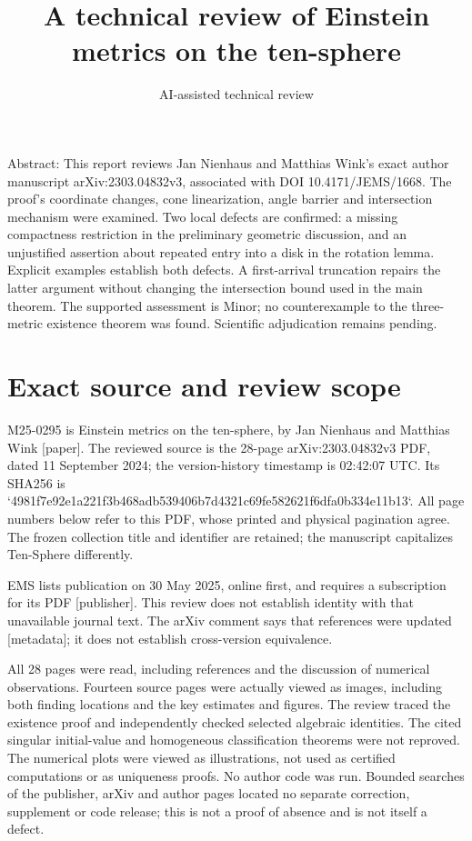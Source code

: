 \documentclass[10pt]{article}
\title{A technical review of
Einstein metrics on the ten-sphere}
\author{AI-assisted technical review}
\date{}
\begin{document}
\maketitle
Abstract: This report reviews Jan Nienhaus and Matthias Wink’s exact author manuscript arXiv:2303.04832v3, associated with DOI 10.4171/JEMS/1668. The proof’s coordinate changes, cone linearization, angle barrier and intersection mechanism were examined. Two local defects are confirmed: a missing compactness restriction in the preliminary geometric discussion, and an unjustified assertion about repeated entry into a disk in the rotation lemma. Explicit examples establish both defects. A first-arrival truncation repairs the latter argument without changing the intersection bound used in the main theorem. The supported assessment is Minor; no counterexample to the three-metric existence theorem was found. Scientific adjudication remains pending.\par
\section*{Exact source and review scope}
M25-0295 is Einstein metrics on the ten-sphere, by Jan Nienhaus and Matthias Wink [paper]. The reviewed source is the 28-page arXiv:2303.04832v3 PDF, dated 11 September 2024; the version-history timestamp is 02:42:07 UTC. Its SHA256 is `4981f7e92e1a221f3b468adb539406b7d4321c69fe582621f6dfa0b334e11b13`. All page numbers below refer to this PDF, whose printed and physical pagination agree. The frozen collection title and identifier are retained; the manuscript capitalizes Ten-Sphere differently.\par
EMS lists publication on 30 May 2025, online first, and requires a subscription for its PDF [publisher]. This review does not establish identity with that unavailable journal text. The arXiv comment says that references were updated [metadata]; it does not establish cross-version equivalence.\par
All 28 pages were read, including references and the discussion of numerical observations. Fourteen source pages were actually viewed as images, including both finding locations and the key estimates and figures. The review traced the existence proof and independently checked selected algebraic identities. The cited singular initial-value and homogeneous classification theorems were not reproved. The numerical plots were viewed as illustrations, not used as certified computations or as uniqueness proofs. No author code was run. Bounded searches of the publisher, arXiv and author pages located no separate correction, supplement or code release; this is not a proof of absence and is not itself a defect.\par
\end{document}
